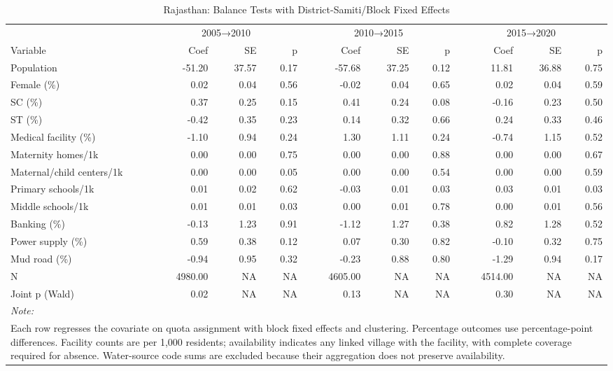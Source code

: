\begin{table}
\centering
\caption{\label{tab:balance_fe_raj}Rajasthan: Balance Tests with District-Samiti/Block Fixed Effects}
\centering
\fontsize{8}{10}\selectfont
\begin{tabular}[t]{lrrrrrrrrr}
\toprule
\multicolumn{1}{c}{ } & \multicolumn{3}{c}{2005→2010} & \multicolumn{3}{c}{2010→2015} & \multicolumn{3}{c}{2015→2020} \\
\cmidrule(l{3pt}r{3pt}){2-4} \cmidrule(l{3pt}r{3pt}){5-7} \cmidrule(l{3pt}r{3pt}){8-10}
Variable & Coef & SE & p & Coef & SE & p & Coef & SE & p\\
\midrule
Population & -51.20 & 37.57 & 0.17 & -57.68 & 37.25 & 0.12 & 11.81 & 36.88 & 0.75\\
Female (\%) & 0.02 & 0.04 & 0.56 & -0.02 & 0.04 & 0.65 & 0.02 & 0.04 & 0.59\\
SC (\%) & 0.37 & 0.25 & 0.15 & 0.41 & 0.24 & 0.08 & -0.16 & 0.23 & 0.50\\
ST (\%) & -0.42 & 0.35 & 0.23 & 0.14 & 0.32 & 0.66 & 0.24 & 0.33 & 0.46\\
Medical facility (\%) & -1.10 & 0.94 & 0.24 & 1.30 & 1.11 & 0.24 & -0.74 & 1.15 & 0.52\\
\addlinespace
Maternity homes/1k & 0.00 & 0.00 & 0.75 & 0.00 & 0.00 & 0.88 & 0.00 & 0.00 & 0.67\\
Maternal/child centers/1k & 0.00 & 0.00 & 0.05 & 0.00 & 0.00 & 0.54 & 0.00 & 0.00 & 0.59\\
Primary schools/1k & 0.01 & 0.02 & 0.62 & -0.03 & 0.01 & 0.03 & 0.03 & 0.01 & 0.03\\
Middle schools/1k & 0.01 & 0.01 & 0.03 & 0.00 & 0.01 & 0.78 & 0.00 & 0.01 & 0.56\\
Banking (\%) & -0.13 & 1.23 & 0.91 & -1.12 & 1.27 & 0.38 & 0.82 & 1.28 & 0.52\\
\addlinespace
Power supply (\%) & 0.59 & 0.38 & 0.12 & 0.07 & 0.30 & 0.82 & -0.10 & 0.32 & 0.75\\
Mud road (\%) & -0.94 & 0.95 & 0.32 & -0.23 & 0.88 & 0.80 & -1.29 & 0.94 & 0.17\\
N & 4980.00 & NA & NA & 4605.00 & NA & NA & 4514.00 & NA & NA\\
Joint p (Wald) & 0.02 & NA & NA & 0.13 & NA & NA & 0.30 & NA & NA\\
\bottomrule
\multicolumn{10}{l}{\rule{0pt}{1em}\textit{Note: }}\\
\multicolumn{10}{l}{\rule{0pt}{1em}Each row regresses the covariate on quota assignment with block fixed effects and clustering. Percentage outcomes use percentage-point differences. Facility counts are per 1,000 residents; availability indicates any linked village with the facility, with complete coverage required for absence. Water-source code sums are excluded because their aggregation does not preserve availability.}\\
\end{tabular}
\end{table}
